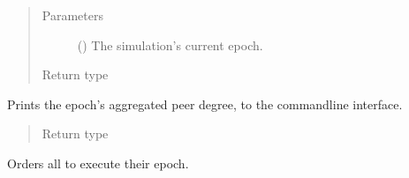 \documentclass[letterpaper,10pt,english]{sphinxmanual}
\begin{document}
\begin{fulllineitems}
\begin{fulllineitems}
\begin{description}
\end{description}
\begin{quote}\begin{description}
\item[{Parameters}] \leavevmode
{} () \textendash{} The simulation’s current epoch.

\item[{Return type}] \leavevmode
{}

\end{description}\end{quote}

\end{fulllineitems}


\begin{fulllineitems}
\label{\detokenize{app.domain:app.domain.cluster_groups.NewscastCluster.evaluate}}
Prints the epoch’s aggregated peer degree, to the command\sphinxhyphen{}line
interface.
\begin{quote}\begin{description}
\item[{Return type}] \leavevmode
{}

\end{description}\end{quote}

\end{fulllineitems}


\begin{fulllineitems}
\label{\detokenize{app.domain:app.domain.cluster_groups.NewscastCluster.execute_epoch}}
Orders all  to execute their epoch.


\end{fulllineitems}
\end{fulllineitems}
\end{document}
